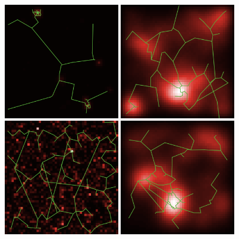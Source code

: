 \begin{figure}
\centering

   \includegraphics[width=0.45\textwidth]{Figures/PartII/Modeling/CorrelatedData/configs/1_param71861_seed0}
   \includegraphics[width=0.45\textwidth]{Figures/PartII/Modeling/CorrelatedData/configs/2_param71913_seed10}\\
   \includegraphics[width=0.45\textwidth]{Figures/PartII/Modeling/CorrelatedData/configs/3_param71918_seed0}
   \includegraphics[width=0.45\textwidth]{Figures/PartII/Modeling/CorrelatedData/configs/4_param71945_seed0}

\end{figure}
